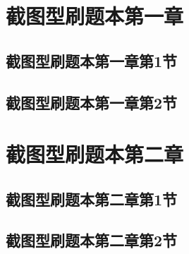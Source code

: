 \documentclass[padl]{ExBook}
\begin{document}
 



\maketitle 

 



\setcounter{page}{1}
\tableofcontents 
    
\clearpage 

\section{截图型刷题本第一章}
\subsection{截图型刷题本第一章第1节}

\begin{qitems}
\end{qitems} 

\subsection{截图型刷题本第一章第2节}

\begin{qitems}
\end{qitems}
 
\section{截图型刷题本第二章}
\subsection{截图型刷题本第二章第1节}

\begin{qitems}
\end{qitems}

\subsection{截图型刷题本第二章第2节}

\begin{qitems}
\end{qitems}
\end{document}
